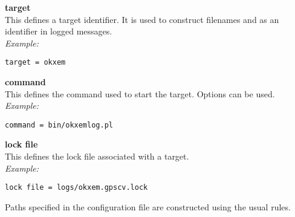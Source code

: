 {\bfseries target}\\
This defines a target identifier. It is used to construct filenames and as an identifier in logged messages.\\
\textit{Example:}
\begin{lstlisting}
target = okxem
\end{lstlisting}

{\bfseries command}\\
This defines the command used to start the target. Options can be used.\\
\textit{Example:}
\begin{lstlisting}
command = bin/okxemlog.pl 
\end{lstlisting}

{\bfseries lock file}\\
This defines the lock file associated with a target.\\
\textit{Example:}
\begin{lstlisting}
lock file = logs/okxem.gpscv.lock
\end{lstlisting}

Paths specified in the configuration file are constructed using the usual rules.


